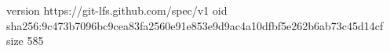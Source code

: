 version https://git-lfs.github.com/spec/v1
oid sha256:9c473b7096bc9cea83fa2560e91e853e9d9ac4a10dfbf5e262b6ab73c45d14cf
size 585
